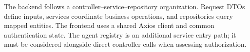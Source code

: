 The backend follows a controller--service--repository organization. Request DTOs define inputs, services coordinate business operations, and repositories query mapped entities. The frontend uses a shared Axios client and common authentication state. The agent registry is an additional service entry path; it must be considered alongside direct controller calls when assessing authorization.
